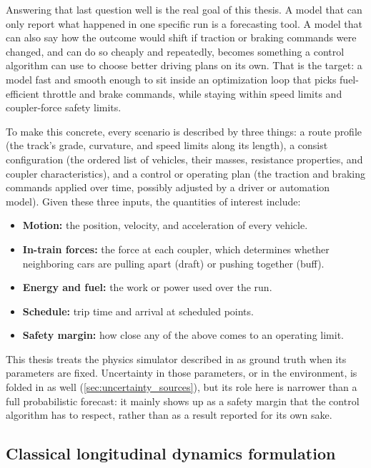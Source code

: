 Answering that last question well is the real goal of this thesis. A model that can only report what happened in one specific run is a forecasting tool. A model that can also say how the outcome would shift if traction or braking commands were changed, and can do so cheaply and repeatedly, becomes something a control algorithm can use to choose better driving plans on its own. That is the target: a model fast and smooth enough to sit inside an optimization loop that picks fuel-efficient throttle and brake commands, while staying within speed limits and coupler-force safety limits.

To make this concrete, every scenario is described by three things: a route profile (the track's grade, curvature, and speed limits along its length), a consist configuration (the ordered list of vehicles, their masses, resistance properties, and coupler characteristics), and a control or operating plan (the traction and braking commands applied over time, possibly adjusted by a driver or automation model). Given these three inputs, the quantities of interest include:

\begin{itemize}
    \item \textbf{Motion:} the position, velocity, and acceleration of every vehicle.
    \item \textbf{In-train forces:} the force at each coupler, which determines whether neighboring cars are pulling apart (draft) or pushing together (buff).
    \item \textbf{Energy and fuel:} the work or power used over the run.
    \item \textbf{Schedule:} trip time and arrival at scheduled points.
    \item \textbf{Safety margin:} how close any of the above comes to an operating limit.
\end{itemize}

This thesis treats the physics simulator described in  as ground truth when its parameters are fixed. Uncertainty in those parameters, or in the environment, is folded in as well (\cref{sec:uncertainty_sources}), but its role here is narrower than a full probabilistic forecast: it mainly shows up as a safety margin that the control algorithm has to respect, rather than as a result reported for its own sake.

\subsection{Classical longitudinal dynamics formulation}
\label{sec:classical_ltd_compact}

